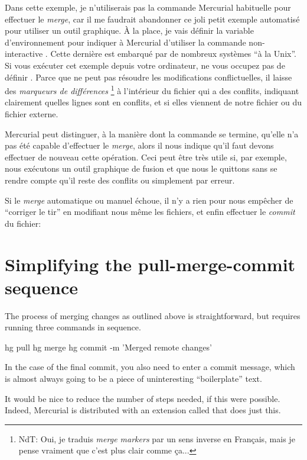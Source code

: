 Dans cette exemple, je n'utiliserais pas la commande Mercurial
habituelle  pour effectuer le \textit{merge},
car il me faudrait abandonner ce joli petit exemple automatisé
pour utiliser un outil graphique. À la place, je vais définir
la variable d'environnement  pour indiquer à 
Mercurial d'utiliser la commande non-interactive .
Cette dernière est embarqué par de nombreux systèmes ``à la Unix''.
Si vous exécuter cet exemple depuis votre ordinateur, ne vous
occupez pas de définir .
Parce que  ne peut pas résoudre les modifications
conflictuelles, il laisse des \emph{marqueurs de différences}
\footnote{NdT: Oui, je traduis \textit{merge markers} par un sens
inverse en Français, mais je pense vraiment que c'est plus clair 
comme ça...} à l'intérieur du fichier qui a des conflits, indiquant
clairement quelles lignes sont en conflits, et si elles viennent de
notre fichier ou du fichier externe.

Mercurial peut distinguer, à la manière dont la commande 
se termine, qu'elle n'a pas été capable d'effectuer le \textit{merge},
alors il nous indique qu'il faut devons effectuer de nouveau cette
opération. Ceci peut être très utile si, par exemple, nous exécutons un
outil graphique de fusion et que nous le quittons sans se rendre compte
qu'il reste des conflits ou simplement par erreur.

Si le \textit{merge} automatique ou manuel échoue, il n'y a rien pour
nous empêcher de ``corriger le tir'' en modifiant nous même les fichiers,
et enfin effectuer le \textit{commit} du fichier:

\section{Simplifying the pull-merge-commit sequence}
\label{sec:tour-merge:fetch}

The process of merging changes as outlined above is straightforward,
but requires running three commands in sequence.
\begin{codesample2}
  hg pull
  hg merge
  hg commit -m 'Merged remote changes'
\end{codesample2}
In the case of the final commit, you also need to enter a commit
message, which is almost always going to be a piece of uninteresting
``boilerplate'' text.

It would be nice to reduce the number of steps needed, if this were
possible.  Indeed, Mercurial is distributed with an extension called
 that does just this.

